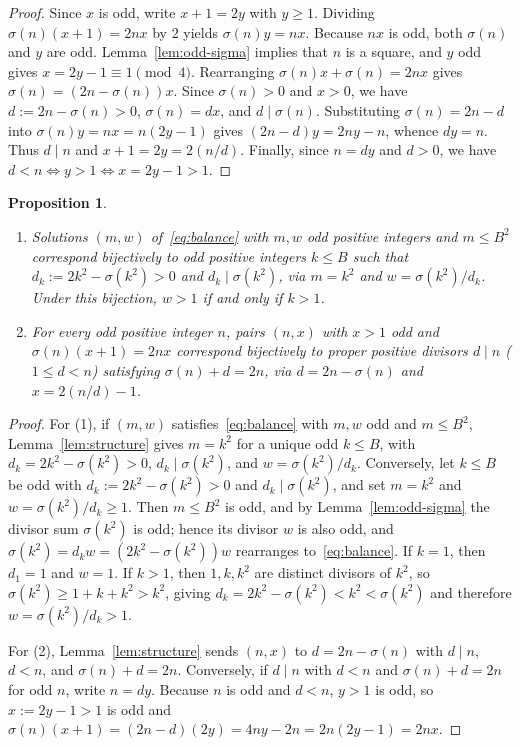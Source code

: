 \documentclass[11pt]{amsart}
\newtheorem{proposition}[theorem]{Proposition}
\theoremstyle{definition}
\theoremstyle{remark}
\begin{document}
\begin{proof}
Since $x$ is odd, write $x + 1 = 2y$ with $y \ge 1$. Dividing $\sigma(n)(x + 1) = 2nx$ by $2$ yields $\sigma(n) y = nx$. Because $nx$ is odd, both $\sigma(n)$ and $y$ are odd. Lemma~\ref{lem:odd-sigma} implies that $n$ is a square, and $y$ odd gives $x = 2y - 1 \equiv 1 \pmod 4$. Rearranging $\sigma(n)x + \sigma(n) = 2nx$ gives $\sigma(n) = (2n - \sigma(n))x$. Since $\sigma(n) > 0$ and $x > 0$, we have $d := 2n - \sigma(n) > 0$, $\sigma(n) = dx$, and $d \mid \sigma(n)$. Substituting $\sigma(n) = 2n - d$ into $\sigma(n) y = nx = n(2y - 1)$ gives $(2n - d)y = 2ny - n$, whence $dy = n$. Thus $d \mid n$ and $x + 1 = 2y = 2(n/d)$. Finally, since $n = dy$ and $d > 0$, we have $d < n \iff y > 1 \iff x = 2y - 1 > 1$.
\end{proof}

\begin{proposition}\label{prop:bijection}
\begin{enumerate}
  \item Solutions $(m, w)$ of~\eqref{eq:balance} with $m, w$ odd positive integers and $m \le B^2$ correspond bijectively to odd positive integers $k \le B$ such that $d_k := 2k^2 - \sigma(k^2) > 0$ and $d_k \mid \sigma(k^2)$, via $m = k^2$ and $w = \sigma(k^2)/d_k$. Under this bijection, $w > 1$ if and only if $k > 1$.
  \item For every odd positive integer $n$, pairs $(n, x)$ with $x > 1$ odd and $\sigma(n)(x + 1) = 2nx$ correspond bijectively to proper positive divisors $d \mid n$ ($1 \le d < n$) satisfying $\sigma(n) + d = 2n$, via $d = 2n - \sigma(n)$ and $x = 2(n/d) - 1$.
\end{enumerate}
\end{proposition}

\begin{proof}
For (1), if $(m, w)$ satisfies~\eqref{eq:balance} with $m, w$ odd and $m \le B^2$, Lemma~\ref{lem:structure} gives $m = k^2$ for a unique odd $k \le B$, with $d_k = 2k^2 - \sigma(k^2) > 0$, $d_k \mid \sigma(k^2)$, and $w = \sigma(k^2)/d_k$. Conversely, let $k \le B$ be odd with $d_k := 2k^2 - \sigma(k^2) > 0$ and $d_k \mid \sigma(k^2)$, and set $m = k^2$ and $w = \sigma(k^2)/d_k \ge 1$. Then $m \le B^2$ is odd, and by Lemma~\ref{lem:odd-sigma} the divisor sum $\sigma(k^2)$ is odd; hence its divisor $w$ is also odd, and $\sigma(k^2) = d_k w = (2k^2 - \sigma(k^2))w$ rearranges to~\eqref{eq:balance}. If $k = 1$, then $d_1 = 1$ and $w = 1$. If $k > 1$, then $1, k, k^2$ are distinct divisors of $k^2$, so $\sigma(k^2) \ge 1 + k + k^2 > k^2$, giving $d_k = 2k^2 - \sigma(k^2) < k^2 < \sigma(k^2)$ and therefore $w = \sigma(k^2)/d_k > 1$.

For (2), Lemma~\ref{lem:structure} sends $(n, x)$ to $d = 2n - \sigma(n)$ with $d \mid n$, $d < n$, and $\sigma(n) + d = 2n$. Conversely, if $d \mid n$ with $d < n$ and $\sigma(n) + d = 2n$ for odd $n$, write $n = dy$. Because $n$ is odd and $d < n$, $y > 1$ is odd, so $x := 2y - 1 > 1$ is odd and $\sigma(n)(x + 1) = (2n - d)(2y) = 4ny - 2n = 2n(2y - 1) = 2nx$.
\end{proof}
\end{document}
